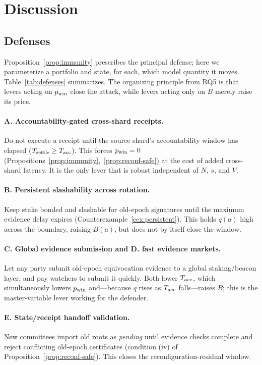 \section{Discussion}
\label{sec:discussion}

\subsection{Defenses}
\label{sec:defenses}

Proposition~\ref{prop:immunity} prescribes the principal defense; here we parameterize a portfolio and
state, for each, which model quantity it moves. Table~\ref{tab:defenses} summarizes. The organizing
principle from RQ5 is that levers acting on $p_{\mathrm{win}}$ close the attack, while levers acting only on $B$
merely raise its price.

\paragraph{A. Accountability-gated cross-shard receipts.}
Do not execute a receipt until the source shard's accountability window has elapsed
($T_{\mathrm{settle}}\ge T_{\mathrm{acc}}$). This forces $p_{\mathrm{win}}=0$ (Propositions~\ref{prop:immunity},~\ref{prop:reconf-safe})
at the cost of added cross-shard latency. It is the only lever that is robust independent of $N$, $s$,
and $V$.

\paragraph{B. Persistent slashability across rotation.}
Keep stake bonded and slashable for old-epoch signatures until the maximum evidence delay expires
(Counterexample~\ref{cex:persistent}). This holds $q(a)$ high across the boundary, raising $B(a)$, but
does not by itself close the window.

\paragraph{C. Global evidence submission and D. fast evidence markets.}
Let any party submit old-epoch equivocation evidence to a global staking/beacon layer, and pay
watchers to submit it quickly. Both lower $T_{\mathrm{acc}}$, which simultaneously lowers $p_{\mathrm{win}}$ and---because
$q$ rises as $T_{\mathrm{acc}}$ falls---raises $B$; this is the master-variable lever working for the defender.

\paragraph{E. State/receipt handoff validation.}
New committees import old roots as \emph{pending} until evidence checks complete and reject conflicting
old-epoch certificates (condition (iv) of Proposition~\ref{prop:reconf-safe}). This closes the
reconfiguration-residual window.

